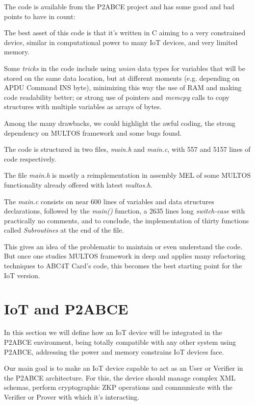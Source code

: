 \hfil

The code is available from the P2ABCE project and has some good and bad points to have in count:

The best asset of this code is that it's written in C aiming to a very constrained device, similar in computational power to many IoT devices, and very limited memory.
	
Some \textit{tricks} in the code include using \textit{union} data types for variables that will be stored on the same data location, but at different moments (e.g. depending on APDU Command INS byte), minimizing this way the use of RAM and making code readability better; or strong use of pointers and \textit{memcpy} calls to copy structures with multiple variables as arrays of bytes.


Among the many drawbacks, we could highlight the awful coding, the strong dependency on MULTOS framework and some bugs found. 

The code is structured in two files, \textit{main.h} and \textit{main.c}, with 557 and 5157 lines of code respectively.

The file \textit{main.h} is mostly a reimplementation in assembly MEL of some MULTOS functionality already offered with latest \textit{multos.h}.

The \textit{main.c} consists on near 600 lines of variables and data structures declarations, followed by the \textit{main()} function, a 2635 lines long \textit{switch-case} with practically no comments, and to conclude, the implementation of thirty functions called \textit{Subroutines} at the end of the file.


This gives an idea of the problematic to maintain or even understand the code. But once one studies MULTOS framework in deep and applies many refactoring techniques to ABC4T Card's code, this becomes the best starting point for the IoT version.





\section{IoT and P2ABCE}

In this section we will define how an IoT device will be integrated in the P2ABCE environment, being totally compatible with any other system using P2ABCE, addressing the power and memory constrains IoT devices face.


\hfil

Our main goal is to make an IoT device capable to act as an User or Verifier in the P2ABCE architecture. For this, the device should manage complex XML schemas, perform cryptographic ZKP operations and communicate with the Verifier or Prover with which it's interacting.

